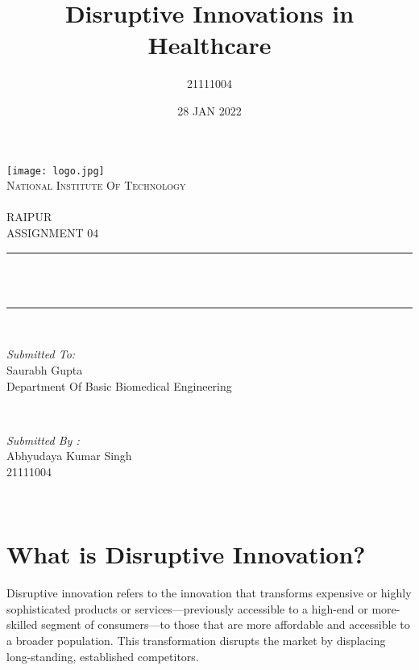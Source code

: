 \documentclass[12pt]{article}
\title{Disruptive Innovations in Healthcare}
\author{21111004}
\date{28 JAN 2022}
\makeatletter
\let\thetitle\@title
\makeatother
\begin{document}
\begin{titlepage}
	\centering
    \texttt{[image: logo.jpg]}\\[1.0 cm]	
    \textsc{\LARGE National Institute Of Technology \newline\\\\ RAIPUR}\\[2.0 CM]
    
	\textsc{\Large ASSIGNMENT 04}\\[0.5 cm]				%
	\rule{\linewidth}{0.4 mm} \\[0.4 cm]
	{ \huge \bfseries \thetitle}\\
	\rule{\linewidth}{0.4 mm} \\[1.5 cm]
	
	\begin{minipage}{0.6\textwidth}
		\begin{flushleft} \large
			\emph{Submitted To:}\\
			Saurabh Gupta\\
            Department Of Basic Biomedical Engineering\\
			\end{flushleft}
			\end{minipage}~
			\begin{minipage}{0.4\textwidth}
            
			\begin{flushright} \large
			\emph{Submitted By :}\\
			Abhyudaya Kumar Singh\\
            21111004\\
		\end{flushright}
        
	\end{minipage}\\[2 cm]
\end{titlepage}

\tableofcontents
\pagebreak

\section{What is Disruptive Innovation?}
Disruptive innovation refers to the innovation that transforms expensive or highly sophisticated products or services—previously accessible to a high-end or more-skilled segment of consumers—to those that are more affordable and accessible to a broader population. This transformation disrupts the market by displacing long-standing, established competitors.
\end{document}

